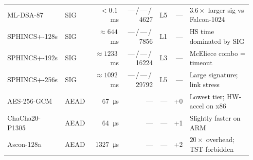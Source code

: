 \begin{table}[!t]
\begin{tabular}{@{}llrrrrl@{}}
ML-DSA-87     & SIG & $<0.1$\,ms & ---\,/\,---\,/\,4627 & L5 & ---
  & $3.6{\times}$ larger sig vs Falcon-1024 \\
SPHINCS+-128s & SIG & ${\approx}644$\,ms  & ---\,/\,---\,/\,7856  & L1 & ---
  & HS time dominated by SIG \\
SPHINCS+-192s & SIG & ${\approx}1233$\,ms & ---\,/\,---\,/\,16224 & L3 & ---
  & McEliece combo = timeout \\
SPHINCS+-256s & SIG & ${\approx}1092$\,ms & ---\,/\,---\,/\,29792 & L5 & ---
  & Large signature; link stress \\
\midrule
AES-256-GCM     & AEAD & \SI{67}{\micro\second} & --- & --- & +0
  & Lowest tier; HW-accel on x86 \\
ChaCha20-P1305  & AEAD & \SI{64}{\micro\second} & --- & --- & +1
  & Slightly faster on ARM \\
Ascon-128a      & AEAD & \SI{1327}{\micro\second}& --- & --- & +2
  & $20{\times}$ overhead; TST-forbidden \\
\bottomrule
\end{tabular}
\end{table}

